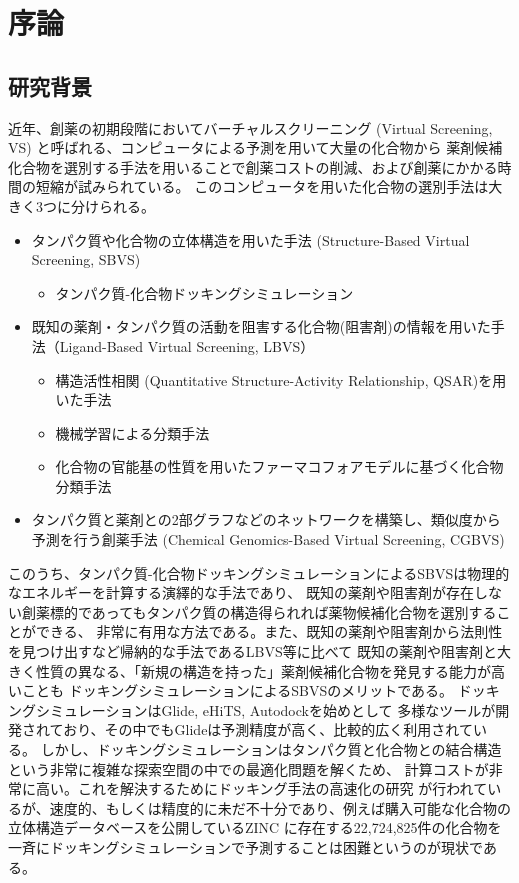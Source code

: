 \chapter{序論}
\section{研究背景}\label{sec:background}
近年、創薬の初期段階においてバーチャルスクリーニング (Virtual Screening, VS) と呼ばれる、コンピュータによる予測を用いて大量の化合物から
薬剤候補化合物を選別する手法を用いることで創薬コストの削減、および創薬にかかる時間の短縮が試みられている。
このコンピュータを用いた化合物の選別手法は大きく3つに分けられる。

\begin{itemize}
\item タンパク質や化合物の立体構造を用いた手法 (Structure-Based Virtual Screening, SBVS)
	\begin{itemize}
	\item タンパク質-化合物ドッキングシミュレーション\cite{Friesner2004, Zsoldos2007, Morris2009}
	\end{itemize}
\item 既知の薬剤・タンパク質の活動を阻害する化合物(阻害剤)の情報を用いた手法（Ligand-Based Virtual Screening, LBVS）
	\begin{itemize}
	\item 構造活性相関 (Quantitative Structure-Activity Relationship, QSAR)を用いた手法\citetodo{}
	\item 機械学習による分類手法\citetodo{}
	\item 化合物の官能基の性質を用いたファーマコフォアモデルに基づく化合物分類手法\citetodo{}
	\end{itemize}
\item タンパク質と薬剤との2部グラフなどのネットワークを構築し、類似度から予測を行う創薬手法 
	(Chemical Genomics-Based Virtual Screening, CGBVS)
\end{itemize}

このうち、タンパク質-化合物ドッキングシミュレーションによるSBVSは物理的なエネルギーを計算する演繹的な手法であり、
既知の薬剤や阻害剤が存在しない創薬標的であってもタンパク質の構造得られれば薬物候補化合物を選別することができる、
非常に有用な方法である。また、既知の薬剤や阻害剤から法則性を見つけ出すなど帰納的な手法であるLBVS等に比べて
既知の薬剤や阻害剤と大きく性質の異なる、「新規の構造を持った」薬剤候補化合物を発見する能力が高いことも
ドッキングシミュレーションによるSBVSのメリットである。
ドッキングシミュレーションはGlide\cite{Friesner2004}, eHiTS\cite{Zsoldos2007}, Autodock\cite{Morris2009}を始めとして
多様なツールが開発されており、その中でもGlideは予測精度が高く、比較的広く利用されている。
しかし、ドッキングシミュレーションはタンパク質と化合物との結合構造という非常に複雑な探索空間の中での最適化問題を解くため、
計算コストが非常に高い。これを解決するためにドッキング手法の高速化の研究\cite{Kannan2010}
が行われているが、速度的、もしくは精度的に未だ不十分であり、例えば購入可能な化合物の立体構造データベースを公開しているZINC
\citetodo{}に存在する22,724,825件の化合物を一斉にドッキングシミュレーションで予測することは困難というのが現状である。

